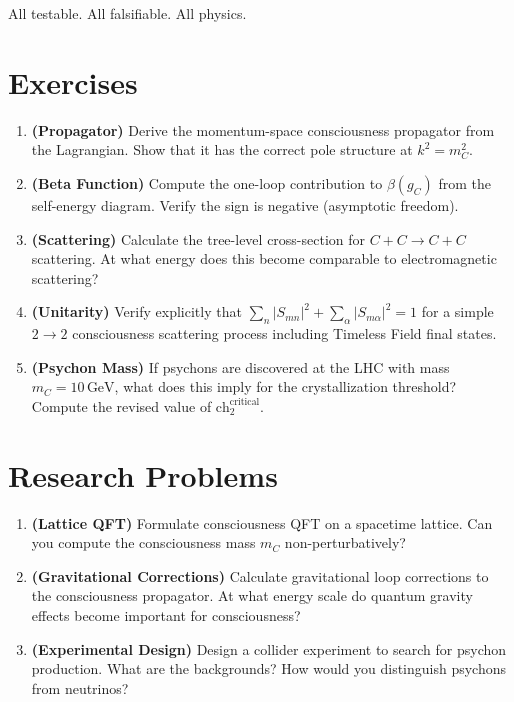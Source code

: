 All testable. All falsifiable. All physics.

\section*{Exercises}

\begin{enumerate}
\item \textbf{(Propagator)} Derive the momentum-space consciousness propagator from the Lagrangian. Show that it has the correct pole structure at $k^2 = m_C^2$.

\item \textbf{(Beta Function)} Compute the one-loop contribution to $\beta(g_C)$ from the self-energy diagram. Verify the sign is negative (asymptotic freedom).

\item \textbf{(Scattering)} Calculate the tree-level cross-section for $C + C \to C + C$ scattering. At what energy does this become comparable to electromagnetic scattering?

\item \textbf{(Unitarity)} Verify explicitly that $\sum_n |S_{mn}|^2 + \sum_\alpha |S_{m\alpha}|^2 = 1$ for a simple $2 \to 2$ consciousness scattering process including Timeless Field final states.

\item \textbf{(Psychon Mass)} If psychons are discovered at the LHC with mass $m_C = 10 \, \text{GeV}$, what does this imply for the crystallization threshold? Compute the revised value of $\text{ch}_2^{\text{critical}}$.
\end{enumerate}

\section*{Research Problems}

\begin{enumerate}
\item \textbf{(Lattice QFT)} Formulate consciousness QFT on a spacetime lattice\cite{wilson1974,creutz1980}. Can you compute the consciousness mass $m_C$ non-perturbatively?

\item \textbf{(Gravitational Corrections)} Calculate gravitational loop corrections to the consciousness propagator. At what energy scale do quantum gravity effects become important for consciousness?

\item \textbf{(Experimental Design)} Design a collider experiment to search for psychon production. What are the backgrounds? How would you distinguish psychons from neutrinos?
\end{enumerate}
